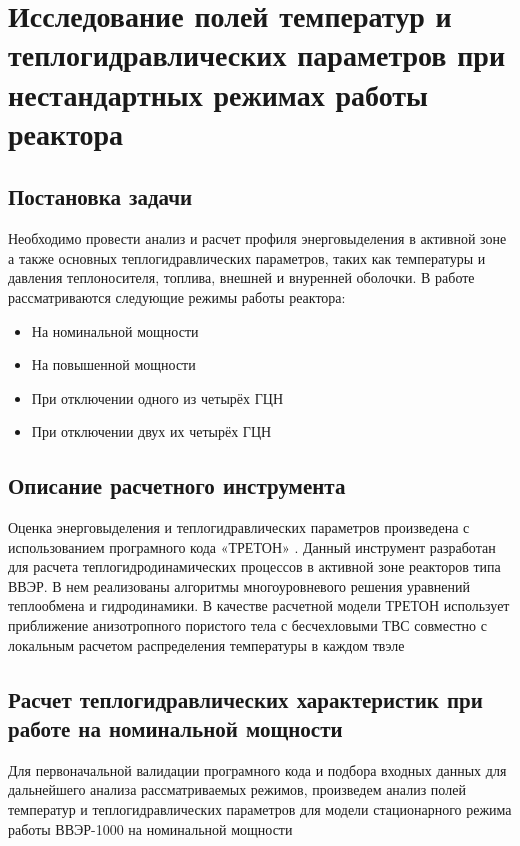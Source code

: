 \section{Исследование полей температур и теплогидравлических параметров при нестандартных режимах работы реактора}

\subsection{Постановка задачи}
Необходимо провести анализ и расчет профиля энерговыделения в активной зоне а также основных теплогидравлических параметров, таких как температуры и давления теплоносителя, топлива, внешней и внуренней оболочки. В работе рассматриваются следующие режимы работы реактора:
\begin{itemize}
    \item На номинальной мощности
    \item На повышенной мощности
    \item При отключении одного из четырёх ГЦН
    \item При отключении двух их четырёх ГЦН
\end{itemize}


\subsection{Описание расчетного инструмента}
Оценка энерговыделения и теплогидравлических параметров произведена с использованием програмного кода «ТРЕТОН» \cite{Маслов5глава}. 
Данный инструмент разработан для расчета теплогидродинамических процессов в активной зоне реакторов типа ВВЭР. В нем реализованы алгоритмы многоуровневого решения уравнений теплообмена и гидродинамики. В качестве расчетной модели ТРЕТОН использует приближение анизотропного пористого тела с бесчехловыми ТВС совместно с локальным расчетом распределения температуры в каждом твэле


\subsection{Расчет теплогидравлических характеристик при работе на номинальной мощности}
Для первоначальной валидации програмного кода и подбора входных данных для дальнейшего анализа рассматриваемых режимов, произведем анализ полей температур и теплогидравлических параметров для модели стационарного режима работы ВВЭР-1000 на номинальной мощности

